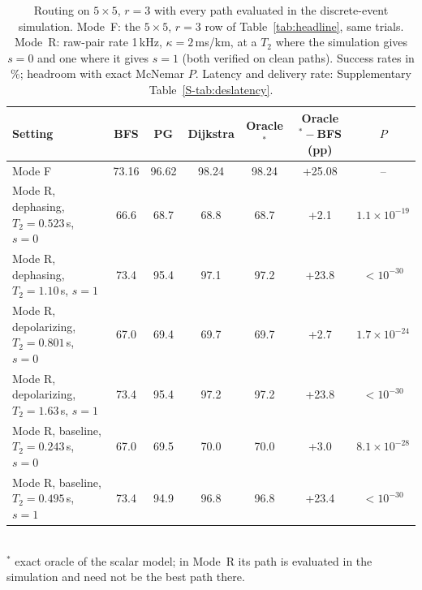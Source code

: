 \begin{table}[t]
\centering
\caption{Routing on $5\times5$, $r=3$ with every path evaluated in the discrete-event simulation. Mode~F: the $5\times5$, $r=3$ row of Table~\ref{tab:headline}, same trials. Mode~R: raw-pair rate 1\,kHz, $\kappa=2$\,ms/km, at a $T_2$ where the simulation gives $s=0$ and one where it gives $s=1$ (both verified on clean paths). Success rates in \%; headroom with exact \textnormal{McNemar} $P$. Latency and delivery rate: Supplementary Table~\ref{S-tab:deslatency}.}
\label{tab:desrouting}
\footnotesize
\begin{tabular}{lcccccc}
\toprule
Setting & BFS & PG & Dijkstra & Oracle$^\ast$ & Oracle$^\ast-$BFS (pp) & $P$\\
\midrule
Mode F & 73.16 & 96.62 & 98.24 & 98.24 & +25.08 & --\\
Mode R, dephasing, $T_2=0.523$\,s, $s=0$ & 66.6 & 68.7 & 68.8 & 68.7 & +2.1 & $1.1\times10^{-19}$\\
Mode R, dephasing, $T_2=1.10$\,s, $s=1$ & 73.4 & 95.4 & 97.1 & 97.2 & +23.8 & $<10^{-30}$\\
Mode R, depolarizing, $T_2=0.801$\,s, $s=0$ & 67.0 & 69.4 & 69.7 & 69.7 & +2.7 & $1.7\times10^{-24}$\\
Mode R, depolarizing, $T_2=1.63$\,s, $s=1$ & 73.4 & 95.4 & 97.2 & 97.2 & +23.8 & $<10^{-30}$\\
Mode R, baseline, $T_2=0.243$\,s, $s=0$ & 67.0 & 69.5 & 70.0 & 70.0 & +3.0 & $8.1\times10^{-28}$\\
Mode R, baseline, $T_2=0.495$\,s, $s=1$ & 73.4 & 94.9 & 96.8 & 96.8 & +23.4 & $<10^{-30}$\\
\bottomrule
\end{tabular}
\\[2pt]{\scriptsize $^\ast$ exact oracle of the scalar model; in Mode~R its path is evaluated in the simulation and need not be the best path there.}
\end{table}

